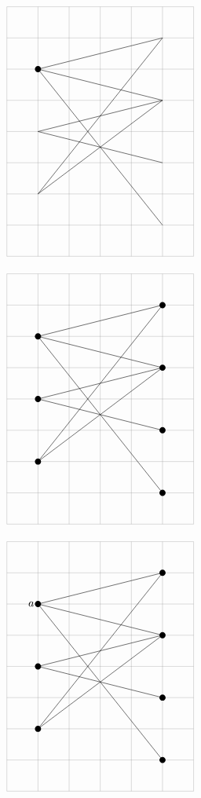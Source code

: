 \documentclass{ctexart}
\begin{document}
\[
  \begin{tikzpicture}
    \tikzstyle{vertex}=[circle, fill, inner sep=2pt]
    \draw [help lines] (-1,-4) grid (5,4);
    \draw (0,2) -- (4,3); \draw (0,2) -- (4,1); \draw (0,2) -- (4,-3);
    \draw (0,0) -- (4,1); \draw (0,0) -- (4,-1);
    \draw (0,-2) -- (4,3); \draw (0,-2) -- (4,1);
    \node [vertex] at (0,2) {};
    \end{tikzpicture}
\]

\[
  \begin{tikzpicture}
    \tikzstyle{vertex}=[circle, fill, inner sep=2pt]
    \draw [help lines] (-1,-4) grid (5,4);
    \draw (0,2) -- (4,3); \draw (0,2) -- (4,1); \draw (0,2) -- (4,-3);
    \draw (0,0) -- (4,1); \draw (0,0) -- (4,-1);
    \draw (0,-2) -- (4,3);
    \draw (0,-2) -- (4,1);
    \node [vertex] at (0,2) {};
    \node [vertex] at (0,0) {};
    \node [vertex] at (0,-2) {};
    \node [vertex] at (4,3) {};
    \node [vertex] at (4,1) {};
    \node [vertex] at (4,-1) {};
    \node [vertex] at (4,-3) {};
\end{tikzpicture}
\]

\[
  \begin{tikzpicture}
    \tikzstyle{vertex}=[circle, fill, inner sep=2pt]
    \draw [help lines] (-1,-4) grid (5,4);
    \draw (0,2) -- (4,3);
    \draw (0,2) -- (4,1); \draw (0,2) -- (4,-3);
    \draw (0,0) -- (4,1); \draw (0,0) -- (4,-1);
    \draw (0,-2) -- (4,3);
    \draw (0,-2) -- (4,1);
    \node [vertex] at (0,2) {};
    \node [left] at (0,2) {$a$};
\node [vertex] at (0,0) {};
\node [vertex] at (0,-2) {};
\node [vertex] at (4,3) {};
\node [vertex] at (4,1) {};
\node [vertex] at (4,-1) {};
\node [vertex] at (4,-3) {};
\end{tikzpicture}
\]
\end{document}

